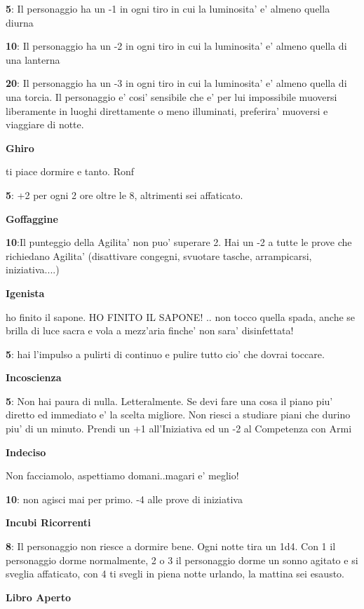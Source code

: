 \documentclass[a4paper,11pt,twoside,openany]{dndbook}
\begin{document}
{\textbf{5}: Il personaggio ha un -1 in ogni tiro in cui la luminosita' e' almeno quella diurna

\textbf{10}: Il personaggio ha un -2 in ogni tiro in cui la luminosita' e' almeno quella di una lanterna

\textbf{20}: Il personaggio ha un -3 in ogni tiro in cui la luminosita' e' almeno quella di una torcia. Il personaggio e' cosi' sensibile che e' per lui impossibile muoversi liberamente in luoghi direttamente o meno illuminati, preferira' muoversi e viaggiare di notte.

\textbf{Ghiro}

ti piace dormire e tanto. Ronf

\textbf{5}: +2 per ogni 2 ore oltre le 8, altrimenti sei affaticato.

\textbf{Goffaggine}

\textbf{10}:Il punteggio della Agilita' non puo' superare 2. Hai un -2 a tutte le prove che richiedano Agilita' (disattivare congegni, svuotare tasche, arrampicarsi, iniziativa....) 

\textbf{Igenista}

ho finito il sapone. HO FINITO IL SAPONE! .. non tocco quella spada, anche se brilla di luce sacra e vola a mezz'aria finche' non sara' disinfettata!

\textbf{5}: hai l'impulso a pulirti di continuo e pulire tutto cio' che dovrai toccare.

\textbf{Incoscienza}

\textbf{5}: Non hai paura di nulla. Letteralmente. Se devi fare una cosa il piano piu' diretto ed immediato e' la scelta migliore. Non riesci a studiare piani che durino piu' di un minuto. Prendi un +1 all'Iniziativa ed un -2 al Competenza con Armi

\textbf{Indeciso}

Non facciamolo, aspettiamo domani..magari e' meglio!

\textbf{10}: non agisci mai per primo. -4 alle prove di iniziativa

\textbf{Incubi Ricorrenti}

\textbf{8}: Il personaggio non riesce a dormire bene. Ogni notte tira un 1d4. Con 1 il personaggio dorme normalmente, 2 o 3 il personaggio dorme un sonno agitato e si sveglia affaticato, con 4 ti svegli in piena notte urlando, la mattina sei esausto.

\textbf{Libro Aperto}

}
\end{document}
